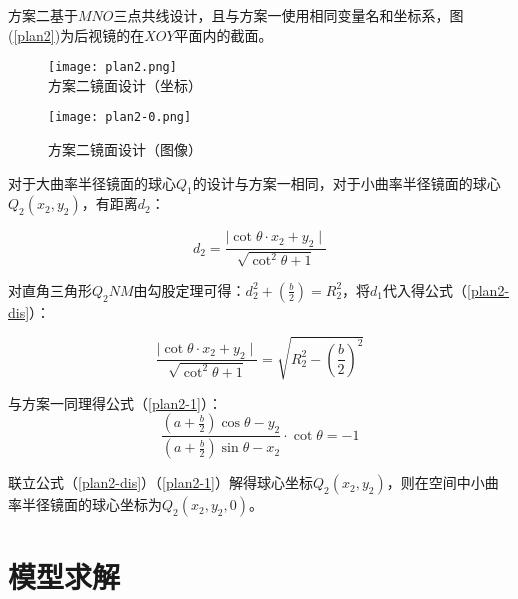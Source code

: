 \documentclass[withoutpreface,bwprint]{cumcmthesis} %
\begin{document}
\par 方案二基于$MNO$三点共线设计，且与方案一使用相同变量名和坐标系，图(\ref{plan2})为后视镜的在$XOY$平面内的截面。


\begin{figure}[!htbp]  
\begin{minipage}[t]{0.5\textwidth}
\centering  
\texttt{[image: plan2.png]} \\
\caption{方案二镜面设计（坐标）} \label{plan2}
\end{minipage}
\hspace{1ex}
\begin{minipage}[t]{0.5\textwidth}  
\centering  
\texttt{[image: plan2-0.png]}\\
\caption{方案二镜面设计（图像）}  \label{plan2-0}
\end{minipage}  
\end{figure} 

\par 对于大曲率半径镜面的球心$Q_1$的设计与方案一相同，对于小曲率半径镜面的球心$Q_2(x_2,y_2)$，有距离$d_2$：

\begin{equation}
	d_2 = \frac{\mid \mathop{cot}\theta \cdot x_2 + y_2 \mid}{\sqrt{\mathop{cot}^{2} \theta + 1}} 
\end{equation}
\par 对直角三角形$Q_2NM$由勾股定理可得：$d_2^2 + \left( \frac{b}{2} \right) = R_2^2$，将$d_1$代入得公式（\ref{plan2-dis}）：

\begin{equation}
\label{plan2-dis}
	\frac{\mid \mathop{cot}\theta \cdot x_2 + y_2 \mid}{\sqrt{\mathop{cot}^{2} \theta + 1}} = \sqrt{R_2^2 - \left( \frac{b}{2} \right)^2} 	
\end{equation}
\par 与方案一同理得公式（\ref{plan2-1}）：
\begin{equation}
\label{plan2-1}
	\frac{\left(a + \frac{b}{2}\right) \mathop{cos} \theta - y_2}{\left( a+ \frac{b}{2} \right) \mathop{sin} \theta - x_2} \cdot \mathop{cot}\theta = -1
\end{equation}
\par 联立公式（\ref{plan2-dis}）（\ref{plan2-1}）解得球心坐标$Q_2(x_2,y_2)$，则在空间中小曲率半径镜面的球心坐标为$Q_2(x_2,y_2,0)$。

\section{模型求解}
\end{document}
